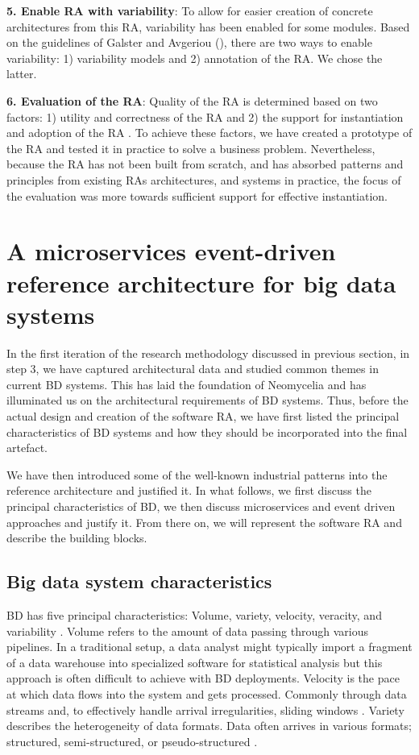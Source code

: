 \documentclass[runningheads]{llncs}
\begin{document}
\textbf{5. Enable RA with variability}: To allow for easier creation of concrete architectures from this RA, variability has been enabled for some modules. Based on the guidelines of Galster and Avgeriou (\cite{GALSTER}), there are two ways to enable variability: 1) variability models and 2) annotation of the RA. We chose the latter.

\textbf{6. Evaluation of the RA}: Quality of the RA is determined based on two factors: 1) utility and correctness of the RA and 2) the support for instantiation and adoption of the RA \cite{GALSTER}. To achieve these factors, we have created a prototype of the RA and tested it in practice to solve a business problem. Nevertheless, because the RA has not been built from scratch, and has absorbed patterns and principles from existing RAs architectures, and systems in practice, the focus of the evaluation was more towards sufficient support for effective instantiation.


\section{A microservices event-driven reference architecture for big data systems}

In the first iteration of the research methodology discussed in previous section, in step 3, we have captured architectural data and studied common themes in current BD systems. This has laid the foundation of Neomycelia and has illuminated us on the architectural requirements of BD systems. Thus, before the actual design and creation of the software RA, we have first listed the principal characteristics of BD systems and how they should be incorporated into the final artefact.

We have then introduced some of the well-known industrial patterns into the reference architecture and justified it. In what follows, we first discuss the principal characteristics of BD, we then discuss microservices and event driven approaches and justify it. From there on, we will represent the software RA and describe the building blocks.

\subsection{Big data system characteristics}

BD has five principal characteristics: Volume, variety, velocity, veracity, and variability \cite{Nadal,AtaeiHype}. Volume refers to the amount of data passing through various pipelines. In a traditional setup, a data analyst might typically import a fragment of a data warehouse into specialized software for statistical analysis \cite{Ordonez} but this approach is often difficult to achieve with BD deployments. Velocity is the pace at which data flows into the system and gets processed. Commonly through data streams and, to effectively handle arrival irregularities, sliding windows \cite{Babcock}. Variety describes the heterogeneity of data formats. Data often arrives in various formats; structured, semi-structured, or pseudo-structured \cite{Terrizzano,AtaeiBigDataEnvirons}.
\end{document}
